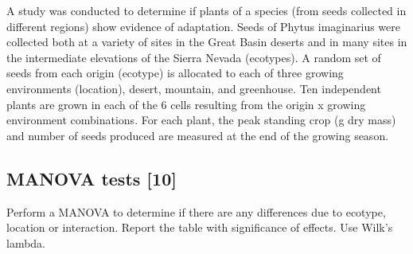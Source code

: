 \documentclass{article}
\begin{document}
A study was conducted to determine if plants of a species (from seeds collected in different regions) show evidence of adaptation. Seeds of Phytus imaginarius were collected both at a variety of sites in the Great Basin deserts and in many sites in the intermediate elevations of the Sierra Nevada (ecotypes). A random set of seeds from each origin (ecotype) is allocated to each of three growing environments (location), desert, mountain, and greenhouse. Ten independent plants are grown in each of the 6 cells resulting from the origin x growing environment combinations. For each plant, the peak standing crop (g dry mass) and number of seeds produced are measured at the end of the growing season.

\subsection{MANOVA tests [10]}

Perform a MANOVA to determine if there are any differences due to ecotype, location or interaction. Report the table with significance of effects. Use Wilk's lambda.
\end{document}
